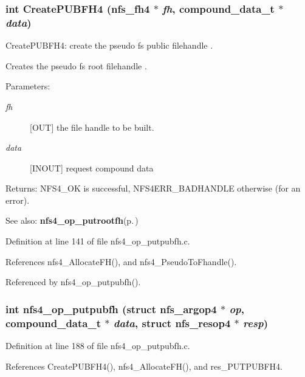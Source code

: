 \subsubsection{\setlength{\rightskip}{0pt plus 5cm}int Create\-PUBFH4 (nfs\_\-fh4 $\ast$ {\em fh}, compound\_\-data\_\-t $\ast$ {\em data})}\label{nfs4__op__putpubfh_8c_a2}


Create\-PUBFH4: create the pseudo fs public filehandle .

Creates the pseudo fs root filehandle .

\begin{Desc}
\item[Parameters:]
\begin{description}
\item[{\em fh}][OUT] the file handle to be built. \item[{\em data}][INOUT] request compound data\end{description}
\end{Desc}
\begin{Desc}
\item[Returns:]NFS4\_\-OK is successful, NFS4ERR\_\-BADHANDLE otherwise (for an error).\end{Desc}
\begin{Desc}
\item[See also:]{\bf nfs4\_\-op\_\-putrootfh}{\rm (p.\,\pageref{nfs4__op__putrootfh_8c_a3})} \end{Desc}


Definition at line 141 of file nfs4\_\-op\_\-putpubfh.c.

References nfs4\_\-Allocate\-FH(), and nfs4\_\-Pseudo\-To\-Fhandle().

Referenced by nfs4\_\-op\_\-putpubfh().
\subsubsection{\setlength{\rightskip}{0pt plus 5cm}int nfs4\_\-op\_\-putpubfh (struct nfs\_\-argop4 $\ast$ {\em op}, compound\_\-data\_\-t $\ast$ {\em data}, struct nfs\_\-resop4 $\ast$ {\em resp})}\label{nfs4__op__putpubfh_8c_a3}




Definition at line 188 of file nfs4\_\-op\_\-putpubfh.c.

References Create\-PUBFH4(), nfs4\_\-Allocate\-FH(), and res\_\-PUTPUBFH4.
